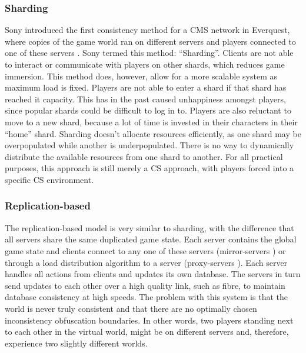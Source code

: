 \documentclass[10pt,a4paper,journal,cspaper,compsoc]{IEEEtran}
\begin{document}
\subsubsection{Sharding}
Sony introduced the first consistency method for a \ac{CMS} network in Everquest, where copies of the game world ran on different servers and players
connected to one of these servers \cite{engineering_everquest}. Sony termed this method: ``Sharding''. Clients are not able to interact or
communicate with players on other shards, which reduces game immersion. This method does, however, allow for a more scalable system as maximum load
is fixed. Players are not able to enter a shard if that shard has reached it capacity. This has in the past caused unhappiness amongst players, since
popular shards could be difficult to log in to. Players are also reluctant to move to a new shard, because a lot of time is invested in their
characters in their ``home'' shard. Sharding doesn't allocate resources efficiently, as one shard may be overpopulated while another is
underpopulated. There is no way to dynamically distribute the available resources from one shard to another. For all practical purposes, this
approach is still merely a \ac{CS} approach, with players forced into a specific \ac{CS} environment.

\subsubsection{Replication-based}
The replication-based model is very similar to sharding, with the difference that all servers share the same duplicated game state. Each server
contains the global game state and clients connect to any one of these servers (mirror-servers \cite{mirrored_server}) or through a load distribution
algorithm to a server (proxy-servers \cite{proxy_server_dist}). Each server handles all actions from clients and updates its own database. The
servers in turn send updates to each other over a high quality link, such as fibre, to maintain database consistency at high speeds. The problem with
this system is that the world is never truly consistent and that there are no optimally chosen inconsistency obfuscation boundaries. In other words,
two players standing next to each other in the virtual world, might be on different servers and, therefore, experience two slightly different worlds.
\end{document}
